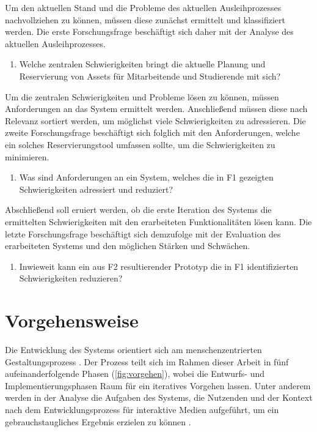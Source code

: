 Um den aktuellen Stand und die Probleme des aktuellen Ausleihprozesses
nachvollziehen zu können, müssen diese zunächst ermittelt und klassifiziert
werden. Die erste Forschungsfrage beschäftigt sich daher mit der Analyse des
aktuellen Ausleihprozesses.
\begin{enumerate}
  \item[\sffamily\color{maincolor} {F1 |}] {Welche zentralen Schwierigkeiten bringt die aktuelle Planung und Reservierung von Assets für Mitarbeitende und Studierende mit sich?}
\end{enumerate}
Um die zentralen Schwierigkeiten und Probleme lösen zu können, müssen
Anforderungen an das System ermittelt werden. Anschließend müssen diese nach
Relevanz sortiert werden, um möglichst viele Schwierigkeiten zu adressieren.
Die zweite Forschungsfrage beschäftigt sich folglich mit den Anforderungen,
welche ein solches Reservierungstool umfassen sollte, um die Schwierigkeiten zu
minimieren.
\begin{enumerate}
  \item[\sffamily\color{maincolor} {F2 |}] {Was sind Anforderungen an ein System, welches die in F1 gezeigten Schwierigkeiten adressiert und reduziert?}
\end{enumerate}
Abschließend soll eruiert werden, ob die erste Iteration des Systems die
ermittelten Schwierigkeiten mit den erarbeiteten Funktionalitäten lösen kann.
Die letzte Forschungsfrage beschäftigt sich demzufolge mit der Evaluation des
erarbeiteten Systems und den möglichen Stärken und Schwächen.
\begin{enumerate}
  \item[\sffamily\color{maincolor} {F3 |}] {Inwieweit kann ein aus F2 resultierender Prototyp die in F1 identifizierten Schwierigkeiten reduzieren?}
\end{enumerate}

\section{Vorgehensweise}
Die Entwicklung des Systems orientiert sich am menschenzentrierten
Gestaltungsprozess \cite{DINISO9241}. Der Prozess teilt sich im Rahmen dieser
Arbeit in fünf aufeinanderfolgende Phasen (\ref{fig:vorgehen}), wobei die
Entwurfs- und Implementierungsphasen Raum für ein iteratives Vorgehen
lassen. Unter anderem werden in der Analyse die Aufgaben des Systems, die
Nutzenden und der Kontext nach dem Entwicklungsprozess für interaktive Medien
aufgeführt, um ein gebrauchstaugliches Ergebnis erzielen zu können
\cite{HerczegMDI2009}.

